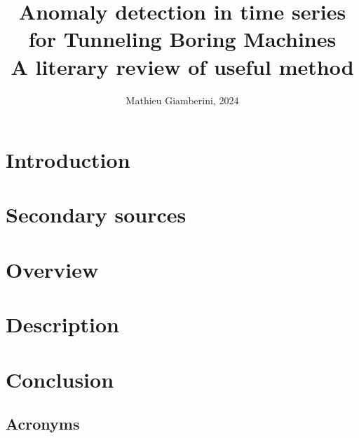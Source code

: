 \documentclass{article}
\title{Anomaly detection in time series for Tunneling Boring Machines \\ \small{A literary review of useful method}}
\author{Mathieu Giamberini, 2024}
\date{}
\begin{document}
    \maketitle
    \begin{abstract}
        
    \end{abstract}
    
    \begin{multicols}{2}
        \cite{dosReis.2016}
        \section*{Introduction}
            

        \section{Secondary sources}
            

        \section{Overview}
            


        \section{Description}
            


        \section*{Conclusion}
            
    
        \begin{mdframed}
            \section*{Acronyms}
            \begin{acronym}[XXXXX] %
            \end{acronym}
        \end{mdframed}

    \end{multicols}
    \printbibliography
\end{document}
